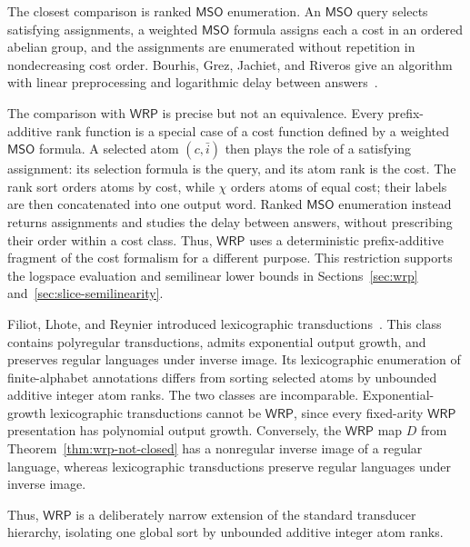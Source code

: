 \documentclass[11pt]{article}
\theoremstyle{definition}
\newcommand{\WRP}{\mathsf{WRP}}
\newcommand{\MSO}{\mathsf{MSO}}
\begin{document}
The closest comparison is ranked $\MSO$ enumeration.  An $\MSO$ query selects
satisfying assignments, a weighted $\MSO$ formula assigns each a cost in an
ordered abelian group, and the assignments are enumerated without repetition
in nondecreasing cost order.  Bourhis, Grez, Jachiet, and Riveros give an
algorithm with linear preprocessing and logarithmic delay between
answers~\cite{BourhisEtAl2021}.

The comparison with $\WRP$ is precise but not an equivalence.  Every
prefix-additive rank function is a special case of a cost function defined by
a weighted $\MSO$ formula.  A selected atom $(c,\bar i)$ then plays the role of
a satisfying assignment: its selection formula is the query, and its atom rank
is the cost.  The rank sort orders atoms by cost, while $\chi$ orders atoms of
equal cost; their labels are then concatenated into one output word.  Ranked
$\MSO$ enumeration instead returns assignments and studies the delay between
answers, without prescribing their order within a cost class.  Thus, $\WRP$
uses a deterministic prefix-additive fragment of the cost formalism for a
different purpose.  This restriction supports the logspace evaluation and
semilinear lower bounds in Sections~\ref{sec:wrp}
and~\ref{sec:slice-semilinearity}.

Filiot, Lhote, and Reynier introduced lexicographic
transductions~\cite{FiliotLhoteReynier2025}.  This class contains polyregular
transductions, admits exponential output growth, and preserves regular
languages under inverse image.  Its
lexicographic enumeration of finite-alphabet annotations differs from sorting
selected atoms by unbounded additive integer atom ranks.  The two classes are
incomparable.  Exponential-growth lexicographic transductions cannot be
$\WRP$, since every fixed-arity $\WRP$ presentation has polynomial output
growth.  Conversely, the $\WRP$ map $D$ from
Theorem~\ref{thm:wrp-not-closed} has a nonregular inverse image of a regular
language, whereas lexicographic transductions preserve regular languages
under inverse image.

Thus, $\WRP$ is a deliberately narrow extension of the standard transducer
hierarchy, isolating one global sort by unbounded additive integer atom ranks.
\end{document}
